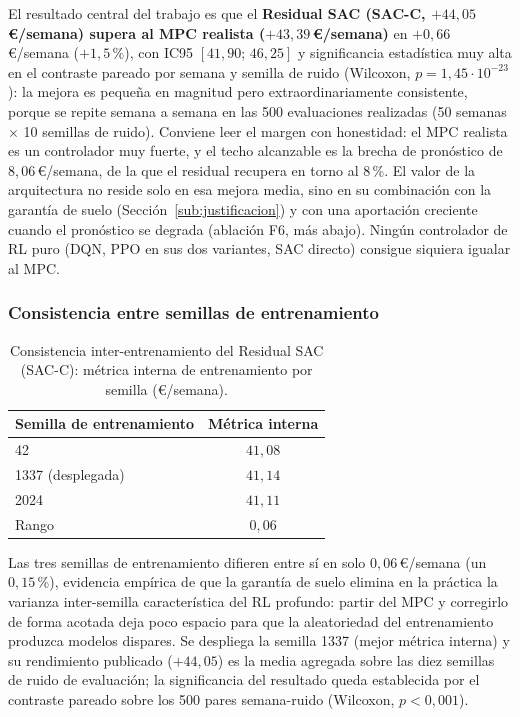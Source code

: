 \documentclass[12pt, a4paper, twoside]{report}
\begin{document}
El resultado central del trabajo es que el \textbf{Residual SAC (SAC-C,
$+44{,}05$\,€/semana) supera al MPC realista ($+43{,}39$\,€/semana)} en
$+0{,}66$\,€/semana ($+1{,}5\,\%$), con IC95 $[41{,}90;\,46{,}25]$ y
significancia estadística muy alta en el contraste pareado por semana y
semilla de ruido (Wilcoxon, $p=1{,}45\cdot10^{-23}$): la mejora es pequeña en magnitud pero
extraordinariamente consistente, porque se repite semana a semana en las 500
evaluaciones realizadas (50 semanas $\times$ 10 semillas de ruido). Conviene
leer el margen con honestidad: el MPC realista es un controlador muy fuerte, y
el techo alcanzable es la brecha de pronóstico de $8{,}06$\,€/semana, de la que
el residual recupera en torno al 8\,\%. El valor de la arquitectura no reside
solo en esa mejora media, sino en su combinación con la garantía de suelo
(Sección~\ref{sub:justificacion}) y con una aportación creciente cuando el
pronóstico se degrada (ablación F6, más abajo). Ningún controlador de RL puro
(DQN, PPO en sus dos variantes, SAC directo) consigue siquiera igualar al MPC.

\subsubsection{Consistencia entre semillas de entrenamiento}

\begin{table}[H]
\centering
\caption{Consistencia inter-entrenamiento del Residual SAC (SAC-C): métrica
interna de entrenamiento por semilla (€/semana).}
\label{tab:seeds}
\begin{tabular}{lc}
\toprule
\textbf{Semilla de entrenamiento} & \textbf{Métrica interna} \\
\midrule
42   & $41{,}08$ \\
1337 (desplegada) & $41{,}14$ \\
2024 & $41{,}11$ \\
\midrule
Rango & $0{,}06$ \\
\bottomrule
\end{tabular}
\end{table}

Las tres semillas de entrenamiento difieren entre sí en solo
$0{,}06$\,€/semana (un $0{,}15\,\%$), evidencia empírica de que la garantía de
suelo elimina en la práctica la varianza inter-semilla característica del RL
profundo: partir del MPC y corregirlo de forma acotada deja poco espacio para
que la aleatoriedad del entrenamiento produzca modelos dispares. Se despliega
la semilla 1337 (mejor métrica interna) y su rendimiento publicado
($+44{,}05$) es la media agregada sobre las diez semillas de ruido de
evaluación; la significancia del resultado queda establecida por el contraste
pareado sobre los 500 pares semana-ruido (Wilcoxon, $p<0{,}001$).
\end{document}
